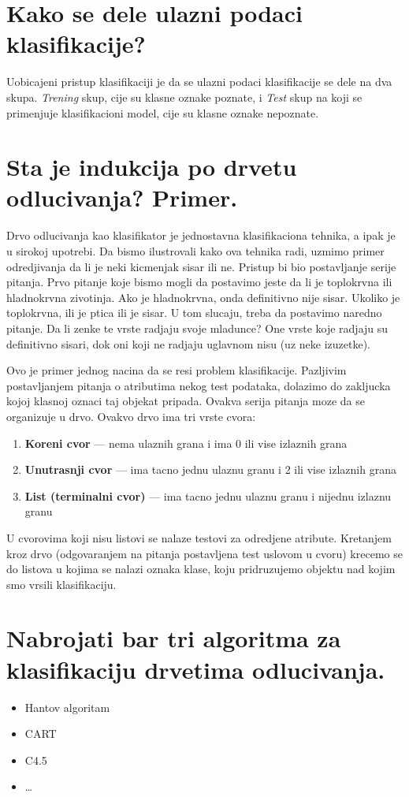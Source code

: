 \documentclass[a4paper]{article}
\begin{document}
\section{Kako se dele ulazni podaci klasifikacije?}
Uobicajeni pristup klasifikaciji je da se ulazni podaci klasifikacije se dele na dva skupa.
\emph{Trening} skup, cije su klasne oznake poznate, i \emph{Test} skup na koji se primenjuje
klasifikacioni model, cije su klasne oznake nepoznate.

\section{Sta je indukcija po drvetu odlucivanja? Primer.}
Drvo odlucivanja kao klasifikator je jednostavna klasifikaciona tehnika, a ipak je u sirokoj
upotrebi. Da bismo ilustrovali kako ova tehnika radi, uzmimo primer odredjivanja da li je neki
kicmenjak sisar ili ne. Pristup bi bio postavljanje serije pitanja. Prvo pitanje koje bismo mogli da
postavimo jeste da li je toplokrvna ili hladnokrvna zivotinja. Ako je hladnokrvna, onda definitivno
nije sisar. Ukoliko je toplokrvna, ili je ptica ili je sisar. U tom slucaju, treba da postavimo
naredno pitanje. Da li zenke te vrste radjaju svoje mladunce? One vrste koje radjaju su definitivno
sisari, dok oni koji ne radjaju uglavnom nisu (uz neke izuzetke).

Ovo je primer jednog nacina da se resi problem klasifikacije. Pazljivim postavljanjem pitanja o
atributima nekog test podataka, dolazimo do zakljucka kojoj klasnoj oznaci taj objekat pripada.
Ovakva serija pitanja moze da se organizuje u drvo. Ovakvo drvo ima tri vrste cvora:
\begin{enumerate}
    \item \textbf{Koreni cvor} --- nema ulaznih grana i ima 0 ili vise izlaznih grana
    \item \textbf{Unutrasnji cvor} --- ima tacno jednu ulaznu granu i 2 ili vise izlaznih grana
    \item \textbf{List (terminalni cvor)} --- ima tacno jednu ulaznu granu i nijednu izlaznu granu
\end{enumerate}

U cvorovima koji nisu listovi se nalaze testovi za odredjene atribute. Kretanjem kroz drvo
(odgovaranjem na pitanja postavljena test uslovom u cvoru) krecemo se do listova u kojima se nalazi
oznaka klase, koju pridruzujemo objektu nad kojim smo vrsili klasifikaciju.

\section{Nabrojati bar tri algoritma za klasifikaciju drvetima odlucivanja.}
\begin{itemize}
    \item Hantov algoritam
    \item CART
    \item C4.5
    \item \ldots
\end{itemize}
\end{document}
